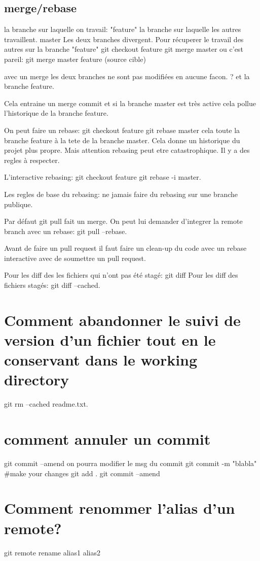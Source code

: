 \documentclass[12pt,a4paper]{article}
\begin{document}
\subsection{merge/rebase}
la branche sur laquelle on travail: "feature"
la branche sur laquelle les autres travaillent. master
Les deux branches divergent. 
Pour récuperer le travail des autres sur la branche "feature"
git checkout feature
git merge master
ou c'est pareil: git merge master feature (source cible)

avec un merge les deux branches ne sont pas modifiées en aucune facon. ? et la branche feature.

Cela entraine un merge commit et si la branche master est très active cela pollue l'historique de la branche feature.

On peut faire un rebase:
git checkout feature
git rebase master
cela toute la branche feature à la tete de la branche master. Cela donne un historique du projet plus propre. Mais attention rebasing peut etre catastrophique. Il y a des regles à respecter.

L'interactive rebasing:
git checkout feature
git rebase -i master.

Les regles de base du rebasing: ne jamais faire du rebasing sur une branche publique.

Par défaut git pull fait un merge. On peut lui demander d'integrer la remote branch avec un rebase: git pull --rebase.

Avant de faire un pull request il faut faire un clean-up du code avec un rebase interactive avec de soumettre un pull request.

Pour les diff des les fichiers qui n'ont pas été stagé: git diff
Pour les diff des fichiers stagés: git diff --cached.

\section{Comment abandonner le suivi de version d'un fichier tout en le conservant dans le working directory}
git rm --cached readme.txt.

\section{comment annuler un commit}
git commit --amend on pourra modifier le msg du commit
git commit -m "blabla"
\#make your changes
git add .
git commit --amend

\section{Comment renommer l'alias d'un remote?}
git remote rename alias1 alias2
\end{document}
